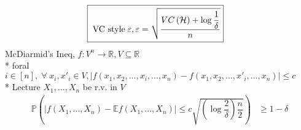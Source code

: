 \documentclass{article}
\begin{document}
\begin{align*}
&\boxed{\text{\;VC style\;} \varepsilon, \varepsilon = \sqrt{\dfrac{VC  \left(\mathcal{H}\right) + \log \dfrac{1}{\delta}}{n}}}
\end{align*}
McDiarmid's Ineq, $f : V^{n} \to  \mathbb{R}, V \subseteq \mathbb{R}$
\\* foral $i \in \left[n\right], \;\forall\; x_{i}, x'_{i} \in V, \left|  f\left(x_{1}, x_{2}, ..., x_{i}, ..., x_{n}\right)  - f\left(x_{1}, x_{2}, ..., x'_{i}, ..., x_{n}\right)  \right| \leq  c $
\\* Lecture $X_{1}, ..., X_{n}$ be r.v. in $V $
\begin{align*}
\mathbb{P}\left(\left|  f\left(X_{1}, ..., X_{n}\right) - \mathbb{E} f\left(X_{1}, ..., X_{n}\right)  \right| \leq  c \sqrt{\left(\log \dfrac{2}{\delta}\right) \dfrac{n}{2}}\right) &\geq  1 - \delta
\end{align*}
\end{document}
